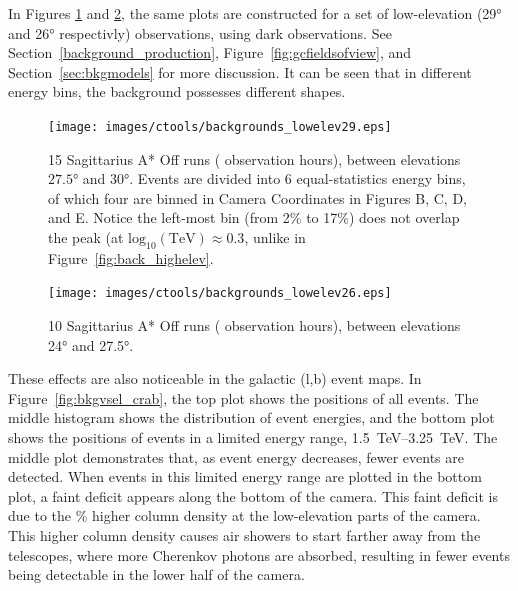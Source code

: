     In Figures \ref{fig:back_lowelev29} and \ref{fig:back_lowelev26}, the same plots are constructed for a set of low-elevation (\nicetilde{}\ang{29} and \nicetilde{}\ang{26} respectivly) observations, using dark observations.
    See Section~\ref{background_production}, Figure~\ref{fig:gcfieldsofview}, and Section~\ref{sec:bkgmodels} for more discussion.
    It can be seen that in different energy bins, the background possesses different shapes.

    \begin{figure}[ht]
      \centering
      \texttt{[image: images/ctools/backgrounds\_lowelev29.eps]}
      \caption[CTOOLS Background at \ang{29} Elevation]{
        15 Sagittarius A* Off runs ( observation hours), between elevations $ \ang{27.5} $ and $ \ang{30} $.
        Events are divided into 6 equal-statistics energy bins, of which four are binned in Camera Coordinates in Figures B, C, D, and E.
        Notice the left-most bin (from 2\% to 17\%) does not overlap the peak (at $\textrm{log}_{10}\left ( \textrm{TeV} \right ) \approx 0.3$, unlike in Figure~\ref{fig:back_highelev}.
      }
      \label{fig:back_lowelev29}
    \end{figure}

    \begin{figure}[ht]
      \centering
      \texttt{[image: images/ctools/backgrounds\_lowelev26.eps]}
      \caption[CTOOLS Background at \ang{26} Elevation]{
        10 Sagittarius A* Off runs ( observation hours), between elevations \ang{24} and \ang{27.5}. 
      }
      \label{fig:back_lowelev26}
    \end{figure}
  
  These effects are also noticeable in the galactic (l,b) event maps.
  In Figure~\ref{fig:bkgvsel_crab}, the top plot shows the positions of all events.
  The middle histogram shows the distribution of event energies, and the bottom plot shows the positions of events in a limited energy range, \SIrange{1.5}{3.25}{\TeV}.
  The middle plot demonstrates that, as event energy decreases, fewer events are detected.
  When events in this limited energy range are plotted in the bottom plot, a faint deficit appears along the bottom of the camera.
  This faint deficit is due to the \% higher column density at the low-elevation parts of the camera.
  This higher column density causes air showers to start farther away from the telescopes, where more Cherenkov photons are absorbed, resulting in fewer events being detectable in the lower half of the camera.

